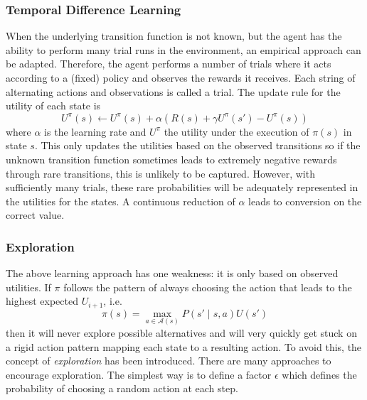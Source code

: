 \subsubsection{Temporal Difference Learning}%
\label{sub:temporal_difference_learning}

When the underlying transition function is not known, but the agent has the ability to perform many trial runs in the
environment, an empirical approach can be adapted. Therefore, the agent performs a number of trials where it acts
according to a (fixed) policy and observes the rewards it receives. Each string of alternating actions and observations
is called a trial.
The update rule for the utility of each state is
\begin{equation}
    U^\pi(s) \gets U^\pi(s) + \alpha(R(s) + \gamma U^\pi(s') - U^\pi(s))
\end{equation}
where $\alpha$ is the learning rate and $U^\pi$ the utility under the execution of $\pi(s)$ in state $s$. This only
updates the utilities based on the observed transitions so if the unknown transition function sometimes leads to
extremely negative rewards through rare transitions, this is unlikely to be captured. However, with sufficiently many
trials, these rare probabilities will be adequately represented in the utilities for the states. A continuous reduction
of $\alpha$ leads to conversion on the correct value.

\subsubsection{Exploration}%
\label{sub:exploration}

The above learning approach has one weakness: it is only based on observed utilities. If $\pi$ follows the pattern of
always choosing the action that leads to the highest expected $U_{i+1}$, i.e.\
\begin{equation}
    \pi(s) = \max_{a \in \mathcal{A}(s)}P(s' \mid s, a)U(s')
\end{equation}
then it will never explore possible alternatives and will very quickly get stuck on a rigid action
pattern mapping each state to a resulting action. To avoid this, the concept of \emph{exploration} has been introduced.
There are many approaches to encourage exploration. The simplest way is to define a factor $\epsilon$ which defines the
probability of choosing a random action at each step.

